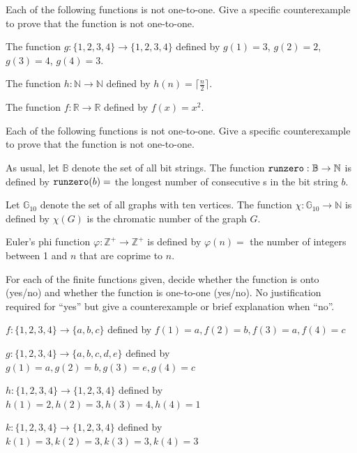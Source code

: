 \begin{exer}[\exerP] %
\label{exer_not_1to1_numbers}
    Each of the following functions is not one-to-one.  Give a specific counterexample to prove that the function is not one-to-one.
        \begin{apart}
            \item The function $g: \{1,2,3,4\} \to \{1,2,3,4\}$ defined by $g(1)=3$, $g(2)=2$, $g(3)=4$, $g(4)=3$.
            \item The function $h: \mathbb{N} \to \mathbb{N}$ defined by $h(n) =\lceil \frac{n}{2} \rceil$.
            \item The function $f: \mathbb{R} \to \mathbb{R}$ defined by $f(x) = x^2$. 
        \end{apart}    
\end{exer}

\begin{exer}[\exerP] %
\label{exer_not_1to1_discrete}
    Each of the following functions is not one-to-one.  Give a specific counterexample to prove that the function is not one-to-one.
        \begin{apart}
            \item As usual, let $\mathbb{B}$ denote the set of all bit strings. The function $\texttt{runzero}: \mathbb{B} \to \mathbb{N}$ is defined by $\texttt{runzero}(b) =$ the longest number of consecutive s in the bit string $b$.
            \item Let $\mathbb{G}_{10}$ denote the set of all graphs with ten vertices. The function $\chi: \mathbb{G}_{10} \to \mathbb{N}$ is defined by $\chi(G)$ is the chromatic number of the graph $G$.
            \item Euler's phi function $\varphi: \mathbb{Z}^+ \to \mathbb{Z}^+$ is defined by $\varphi(n)=$ the number of integers between 1 and $n$ that are coprime to $n$.
        \end{apart}    
\end{exer}

\begin{exer} [\exerU] %
\label{exer_finite_onetoone_onto}
    For each of the finite functions given, decide whether the function is onto (yes/no) and whether the function is one-to-one (yes/no).  No justification required for ``yes'' but give a counterexample or brief explanation when ``no''. 
       \begin{apart}
           \item $f: \{1, 2, 3, 4\} \to \{a, b, c\}$ defined by $f(1) = a, f(2) = b, f(3) = a, f(4) = c$
           \item $g: \{1, 2, 3, 4\} \to \{a, b, c, d,e\}$ defined by $g(1) = a, g(2) = b, g(3) = e, g(4) = c$
           \item $h: \{1, 2, 3, 4\} \to \{1,2,3,4\}$ defined by $h(1) = 2, h(2) = 3, h(3) = 4, h(4) = 1$
           \item $k: \{1, 2, 3, 4\} \to \{1,2,3,4\}$ defined by $k(1) = 3, k(2) = 3, k(3) = 3, k(4) =3$
        \end{apart}
\end{exer}

